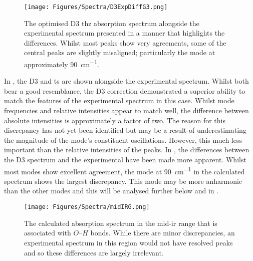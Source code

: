\begin{figure}[!htb]
    \centering
    \texttt{[image: Figures/Spectra/D3ExpDiffG3.png]}
    \captionsetup{font = footnotesize, justification = centering}
    \caption[The Optimised D3 Terahertz Absorption Spectrum alongside the Experimental Spectrum]{The optimised D3 \acrshort{thz} absorption spectrum alongside the experimental spectrum presented in a manner that highlights the differences. Whilst most peaks show very agreements, some of the central peaks are slightly misaligned; particularly the mode at approximately \SI{90}{cm^{-1}}.}
    \label{fig:diff_d3_exp}
\end{figure}

In , the D3 and \acrshort{ts} are shown alongside the experimental spectrum. Whilst both bear a good resemblance, the D3 correction demonstrated a superior ability to match the features of the experimental spectrum in this case. Whilst mode frequencies and relative intensities appear to match well, the difference between absolute intensities is approximately a factor of two. The reason for this discrepancy has not yet been identified but may be a result of underestimating the magnitude of the mode's constituent oscillations. However, this \DIFdelbegin {}\DIFdelend much less important than the relative intensities of the peaks. In , the differences between the D3 spectrum and the experimental have been made more apparent. Whilst most modes show excellent agreement, the mode at \SI{90}{cm^{-1}} in the calculated spectrum shows the largest discrepancy. This mode may be more anharmonic than the other modes and this will be analysed further below and in .

\begin{figure}[!htb]
    \centering
    \texttt{[image: Figures/Spectra/midIRG.png]}
    \captionsetup{font = footnotesize, justification = centering}
    \caption[The Calculated Absorption Spectrum in the Frequency Range Associated with OH Bonds]{The calculated absorption spectrum in the mid\nobreakdash-\acrshort{ir} range that is associated with \(O\)\nobreakdash--\(H\) bonds. While there are minor discrepancies, an experimental spectrum in this region would not have resolved peaks and so these differences are largely irrelevant.}
    \label{fig:midIR}
\end{figure}

